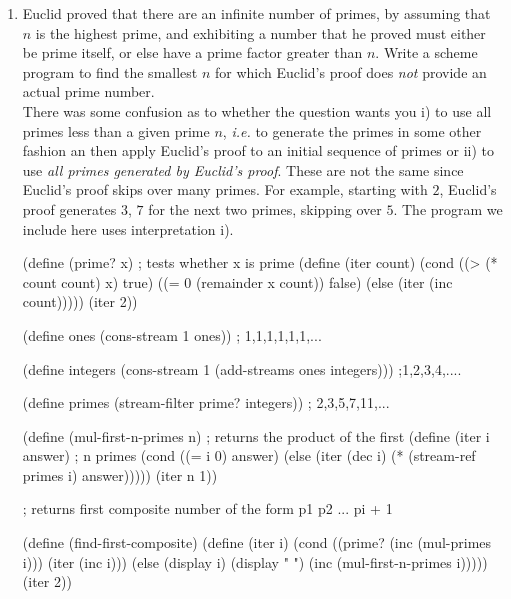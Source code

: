 \documentclass[12pt]{amsart}
\begin{document}
\begin{enumerate}
\item
    Euclid proved that there are an infinite number of primes, by
    assuming that  $ n$ is the highest prime, and exhibiting a number
    that he proved must either be prime itself, or else have a prime
    factor greater than  $ n $. Write a scheme program to find
    the smallest  $ n$ for which Euclid's proof does
     {\em not} provide an actual prime number.\\
    There was some confusion as to whether the question wants
    you i) to use all primes less than a given prime $n$,
    {\em i.e.} to generate the primes in some other fashion
    an then apply Euclid's proof to an initial sequence of primes
    or ii) to use  {\em all primes generated by Euclid's proof}. These
    are not the same since Euclid's proof skips over many primes.
    For example, starting with $2$, Euclid's proof generates $3$, $7$ for
    the next two primes, skipping over $5$. The program we include here
    uses interpretation i).

\vskip 10pt

\beginlisp
(define (prime? x)    ; tests whether x is prime
 (define (iter count)
  (cond   ((> (* count count) x) true)
          ((= 0 (remainder x count)) false)
          (else (iter (inc count)))))
 (iter 2))
\endlisp

\vskip 10pt

\beginlisp
(define ones (cons-stream 1 ones))   ; 1,1,1,1,1,1,...
\endlisp

\vskip 10pt

\beginlisp
(define integers (cons-stream 1 (add-streams ones integers)))
;1,2,3,4,....
\endlisp

\vskip 10pt

\beginlisp
(define primes (stream-filter prime? integers))  ; 2,3,5,7,11,...
\endlisp

\vskip 10pt

\beginlisp
(define (mul-first-n-primes n) ; returns the product of the first
 (define (iter i answer)       ; n primes
  (cond ((= i 0) answer)
        (else (iter (dec i) (* (stream-ref primes i) answer)))))
 (iter n 1))
\endlisp

\vskip 10pt 
\beginlisp
; returns first composite number of the form p1 p2 ... pi + 1
\endlisp

\beginlisp
(define (find-first-composite)
 (define (iter i)
  (cond ((prime? (inc (mul-primes i)))
         (iter (inc i)))
        (else (display i)
              (display "   ")
              (inc (mul-first-n-primes i)))))
 (iter 2))
\endlisp


\end{enumerate}
\end{document}
